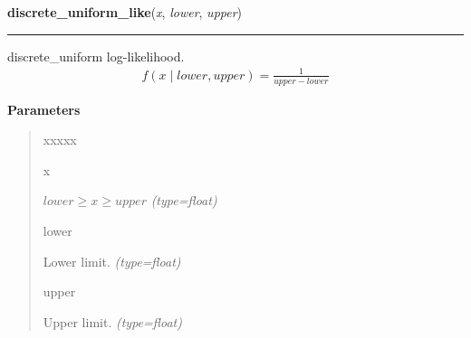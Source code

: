     \label{pymc:distributions:discrete_uniform_like}

    \vspace{0.5ex}

    \begin{boxedminipage}{\textwidth}

    \raggedright \textbf{discrete\_uniform\_like}(\textit{x}, \textit{lower}, \textit{upper})

    \vspace{-1.5ex}

    \rule{\textwidth}{0.5\fboxrule}

discrete{\_}uniform log-likelihood.
\begin{equation*}\begin{split}f(x \mid lower, upper) = \frac{1}{upper-lower}\end{split}\end{equation*}    \vspace{1ex}

      \textbf{Parameters}
      \begin{quote}
        \begin{Ventry}{xxxxx}

          \item[x]


$lower \geq x \geq upper$
            \textit{(type=float)}

          \item[lower]


Lower limit.
            \textit{(type=float)}

          \item[upper]


Upper limit.
            \textit{(type=float)}

        \end{Ventry}

      \end{quote}

    \vspace{1ex}

    \end{boxedminipage}

    \label{pymc:distributions:runiform}

    \vspace{0.5ex}

